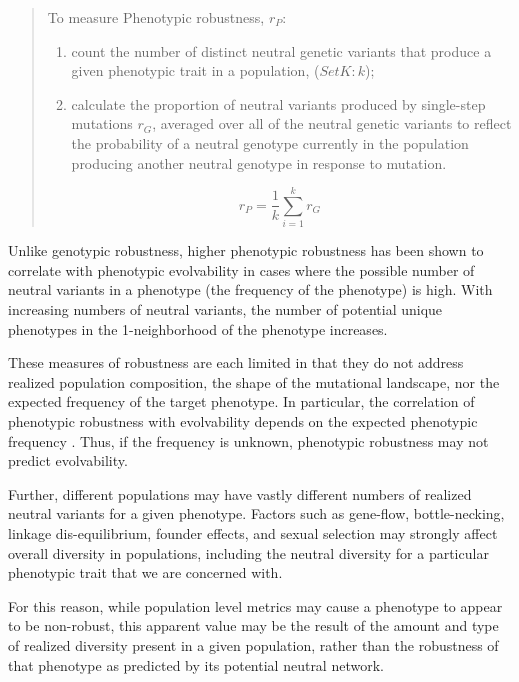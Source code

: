 \documentclass[PhD]{msu-thesis}
\begin{document}
\begin{quote}
To measure Phenotypic robustness, $r_P$:

\begin{enumerate}
\item count the number of distinct neutral genetic variants that produce a given phenotypic trait in a population, ($Set K: k$);
\item calculate the proportion of neutral variants produced by single-step mutations $r_G$, averaged over all of the neutral genetic variants to reflect the probability of a neutral genotype currently in the population producing another neutral genotype in response to mutation.
\end{enumerate}
\begin{equation}
r_{P} = \frac{1}{k} \sum_{i=1}^{k} r_{G} 
\end{equation}
\end{quote}

Unlike genotypic robustness, higher phenotypic robustness has been shown to correlate with phenotypic evolvability in cases where the possible number of neutral variants in a phenotype (the frequency of the phenotype) is high\cite{andreas_wagner_robustness_2008}. With increasing numbers of neutral variants, the number of potential unique phenotypes in the 1-neighborhood of the phenotype increases.

These measures of robustness are each limited in that they do not address realized population composition, the shape of the mutational landscape, nor the expected frequency of the target phenotype. In particular, the correlation of phenotypic robustness with evolvability depends on the expected phenotypic frequency \cite{andreas_wagner_robustness_2008}. Thus, if the frequency is unknown, phenotypic robustness may not predict evolvability.

Further, different populations may have vastly different numbers of realized neutral variants for a given phenotype. Factors such as gene-flow, bottle-necking, linkage dis-equilibrium, founder effects, and sexual selection may strongly affect overall diversity in populations, including the neutral diversity for a particular phenotypic trait that we are concerned with\cite{alberch_genes_1991}.

For this reason, while population level metrics may cause a phenotype to appear to be non-robust, this apparent value may be the result of the amount and type of realized diversity present in a given population, rather than the robustness of that phenotype as predicted by its potential neutral network\cite{alberch_genes_1991}. 
\end{document}
